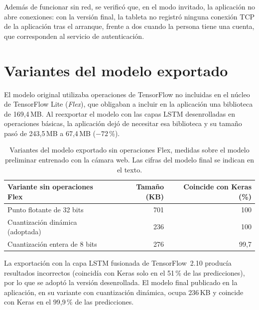 Además de funcionar sin red, se verificó que, en el modo invitado, la aplicación no abre conexiones: con la versión final, la tableta no registró ninguna conexión TCP de la aplicación tras el arranque, frente a dos cuando la persona tiene una cuenta, que corresponden al servicio de autenticación.

\section{Variantes del modelo exportado}
\label{sec:res-variantes}

El modelo original utilizaba operaciones de TensorFlow no incluidas en el núcleo de TensorFlow Lite (\emph{Flex}), que obligaban a incluir en la aplicación una biblioteca de 169,4\,MB. Al reexportar el modelo con las capas LSTM desenrolladas en operaciones básicas, la aplicación dejó de necesitar esa biblioteca y su tamaño pasó de 243,5\,MB a 67,4\,MB ($-72$\,\%).

\begin{table}[h]
    \centering
    \begin{tabular}{lrr}
        \toprule
        Variante sin operaciones Flex & Tamaño (KB) & Coincide con Keras (\%) \\
        \midrule
        Punto flotante de 32 bits & 701 & 100 \\
        Cuantización dinámica (adoptada) & 236 & 100 \\
        Cuantización entera de 8 bits & 276 & 99,7 \\
        \bottomrule
    \end{tabular}
    \caption{Variantes del modelo exportado sin operaciones Flex, medidas sobre el modelo preliminar entrenado con la cámara web. Las cifras del modelo final se indican en el texto.}
    \label{tab:variantes}
\end{table}

La exportación con la capa LSTM fusionada de TensorFlow~2.10 producía resultados incorrectos (coincidía con Keras solo en el 51\,\% de las predicciones), por lo que se adoptó la versión desenrollada. El modelo final publicado en la aplicación, en su variante con cuantización dinámica, ocupa 236\,KB y coincide con Keras en el 99,9\,\% de las predicciones.
